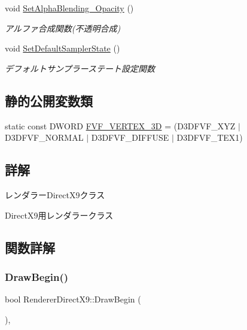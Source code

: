 \begin{DoxyCompactItemize}
void \mbox{\hyperlink{class_renderer_direct_x9_a789206ba211e9cbffe0bfe4c7dfb7457}{Set\+Alpha\+Blending\+\_\+\+Opacity}} ()
\begin{DoxyCompactList}\small\item\em アルファ合成関数(不透明合成) \end{DoxyCompactList}\item 
void \mbox{\hyperlink{class_renderer_direct_x9_a229cd266427d96486c43d2e63300e438}{Set\+Default\+Sampler\+State}} ()
\begin{DoxyCompactList}\small\item\em デフォルトサンプラーステート設定関数 \end{DoxyCompactList}\end{DoxyCompactItemize}
\subsection*{静的公開変数類}
\begin{DoxyCompactItemize}
\item 
static const D\+W\+O\+RD \mbox{\hyperlink{class_renderer_direct_x9_a80ce0089b01354986332553353625da6}{F\+V\+F\+\_\+\+V\+E\+R\+T\+E\+X\+\_\+3D}} = (D3\+D\+F\+V\+F\+\_\+\+X\+YZ $\vert$ D3\+D\+F\+V\+F\+\_\+\+N\+O\+R\+M\+AL $\vert$ D3\+D\+F\+V\+F\+\_\+\+D\+I\+F\+F\+U\+SE $\vert$ D3\+D\+F\+V\+F\+\_\+\+T\+E\+X1)
\end{DoxyCompactItemize}


\subsection{詳解}
レンダラー\+Direct\+X9クラス 

Direct\+X9用レンダラークラス 

\subsection{関数詳解}
\mbox{\label{class_renderer_direct_x9_a5113bf4e6aefdb7bcab2016fbbee0174}} 
\subsubsection{\texorpdfstring{Draw\+Begin()}{DrawBegin()}}
{\footnotesize\ttfamily bool Renderer\+Direct\+X9\+::\+Draw\+Begin (\begin{DoxyParamCaption}{ }\end{DoxyParamCaption})\hspace{0.3cm}{\ttfamily [override]}, {\ttfamily [virtual]}}



